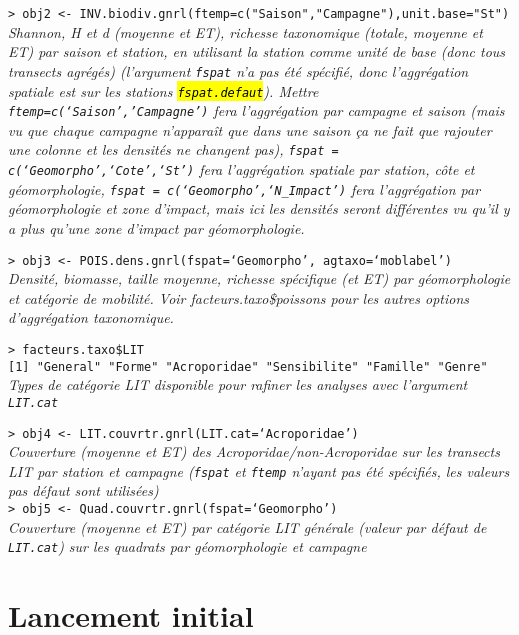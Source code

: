 \documentclass{article}
\begin{document}
\texttt{> obj2 <- INV.biodiv.gnrl(ftemp=c("Saison","Campagne"),unit.base="St")}\\
\emph{Shannon, H et d (moyenne et ET), richesse taxonomique (totale, moyenne
et ET) par saison et station, en utilisant la station comme unité de
base (donc tous transects agrégés)  (l'argument
\texttt{fspat} n'a pas été spécifié, donc l'aggrégation spatiale est
sur les stations \hl{\texttt{fspat.defaut}}).
Mettre \texttt{ftemp=c(`Saison','Campagne')} fera l'aggrégation par
campagne et saison (mais vu que chaque campagne n'apparaît que dans
une saison ça ne fait que rajouter une colonne et les densités ne
changent pas), \texttt{fspat =
  c(`Geomorpho',`Cote',`St')} fera l'aggrégation spatiale par
station, côte et géomorphologie, \texttt{fspat =
  c(`Geomorpho',`N\_Impact')} fera l'aggrégation par géomorphologie et
zone d'impact, mais ici les densités seront différentes vu qu'il y a
plus qu'une zone d'impact par géomorphologie.}

\texttt{> obj3 <- POIS.dens.gnrl(fspat=`Geomorpho', agtaxo=`moblabel')}\\
\emph{Densité, biomasse, taille moyenne, richesse spécifique (et ET)
  par géomorphologie et catégorie de mobilité. Voir
  facteurs.taxo\$poissons pour les autres options d'aggrégation taxonomique.}

\texttt{> facteurs.taxo\$LIT}\\
\texttt{[1] "General"     "Forme"       "Acroporidae" "Sensibilite"
  "Famille" "Genre" }\\
\emph{Types de catégorie LIT disponible pour rafiner les analyses avec
l'argument \texttt{LIT.cat}}

\texttt{> obj4 <- LIT.couvrtr.gnrl(LIT.cat=`Acroporidae')}\\
\emph{Couverture (moyenne et ET) des Acroporidae/non-Acroporidae sur
  les transects LIT par station et campagne (\texttt{fspat} et
  \texttt{ftemp} n'ayant pas été spécifiés, les valeurs pas défaut
  sont utilisées)}\\

\texttt{> obj5 <- Quad.couvrtr.gnrl(fspat=`Geomorpho')}\\
\emph{Couverture (moyenne et ET) par catégorie LIT générale (valeur
  par défaut de \texttt{LIT.cat}) sur
  les quadrats par géomorphologie et campagne}\\

\section{Lancement initial}
\end{document}
